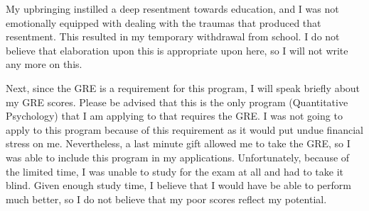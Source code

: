 \documentclass[12pt]{article}
\begin{document}





My upbringing instilled a deep resentment towards education, and I was not emotionally equipped with dealing with the traumas that produced
that resentment.  This resulted in my temporary withdrawal from school.  I do not believe that elaboration upon this is appropriate upon
here, so I will not write any more on this.

Next, since the GRE is a requirement for this program, I will speak briefly about my GRE scores.  Please be advised that this is the only
program (Quantitative Psychology) that I am applying to that requires the GRE.  I was not going to apply to this program because of this
requirement as it would put undue financial stress on me.  Nevertheless, a last minute gift allowed me to take the GRE, so I was able to
include this program in my applications.  Unfortunately, because of the limited time, I was unable to study for the exam at all and had to
take it blind.  Given enough study time, I believe that I would have be able to perform much better, so I do not believe that my poor scores
reflect my potential.
\end{document}
